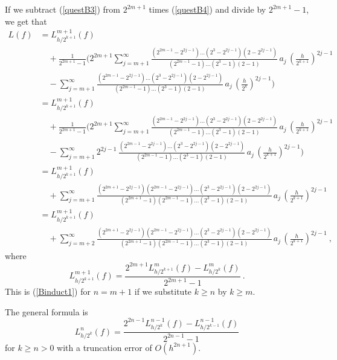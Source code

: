 {If we subtract (\ref{questB3}) from $\displaystyle 2^{2m+1}$
times (\ref{questB4}) and divide by $\displaystyle 2^{2m+1}-1$, we get that
\begin{align*}
L(f) &= L_{h/2^{k+1}}^{m+1}(f) \\
&\quad + \frac{1}{2^{2m+1}-1}
\bigg( 2^{2m+1} \sum_{j=m+1}^\infty
\frac{(2^{2m-1}-2^{2j-1}) \ldots (2^3-2^{2j-1})(2-2^{2j-1})}
{(2^{2m-1}-1)\ldots(2^3-1)(2-1)}\, a_j\, \left(\frac{h}{2^{k+1}}\right)^{2j-1} \\
&\quad -\sum_{j=m+1}^\infty
\frac{(2^{2m-1}-2^{2j-1}) \ldots (2^3-2^{2j-1})(2-2^{2j-1})}
{(2^{2m-1}-1)\ldots(2^3-1)(2-1)}\, a_j\, \left(\frac{h}{2^k}\right)^{2j-1}
\bigg) \\
&= L_{h/2^{k+1}}^{m+1}(f) \\
&\quad + \frac{1}{2^{2m+1}-1}
\bigg( 2^{2m+1} \sum_{j=m+1}^\infty
\frac{(2^{2m-1}-2^{2j-1}) \ldots (2^3-2^{2j-1})(2-2^{2j-1})}
{(2^{2m-1}-1)\ldots(2^3-1)(2-1)}\, a_j\, \left(\frac{h}{2^{k+1}}\right)^{2j-1} \\
&\quad -\sum_{j=m+1}^\infty
2^{2j-1} \,\frac{(2^{2m-1}-2^{2j-1}) \ldots (2^3-2^{2j-1})(2-2^{2j-1})}
{(2^{2m-1}-1)\ldots(2^3-1)(2-1)}\, a_j\, \left(\frac{h}{2^{k+1}}\right)^{2j-1}
\bigg) \\
&= L_{h/2^{k+1}}^{m+1}(f) \\
&\quad + \sum_{j=m+1}^\infty
\frac{(2^{2m+1} - 2^{2j-1})(2^{2m-1}-2^{2j-1}) \ldots (2^3-2^{2j-1})(2-2^{2j-1})}
{(2^{2m+1}-1)(2^{2m-1}-1)\ldots(2^3-1)(2-1)}\,
a_j\, \left(\frac{h}{2^{k+1}}\right)^{2j-1} \\
&= L_{h/2^{k+1}}^{m+1}(f) \\
&\quad + \sum_{j=m+2}^\infty
\frac{(2^{2m+1} - 2^{2j-1})(2^{2m-1}-2^{2j-1}) \ldots (2^3-2^{2j-1})(2-2^{2j-1})}
{(2^{2m+1}-1)(2^{2m-1}-1)\ldots(2^3-1)(2-1)}\,
 a_j\, \left(\frac{h}{2^{k+1}}\right)^{2j-1}\ ,
\end{align*}
where
\[
L_{h/2^{k+1}}^{m+1}(f) = \frac{2^{2m+1}L_{h/2^{k+1}}^m(f)-L_{h/2^k}^m(f)}
{2^{2m+1}-1} \ .
\]
This is (\ref{Binduct1}) for $n=m+1$ if we substitute
$k \geq n$ by $k\geq m$.

The general formula is
\[
L_{h/2^k}^n(f) = \frac{2^{2n-1} L_{h/2^k}^{n-1}(f) -
  L_{h/2^{k-1}}^{n-1}(f)}{2^{2n-1} -1}
\]
for $k \geq n > 0$ with a truncation error of $\displaystyle O(h^{2n+1})$.
}

